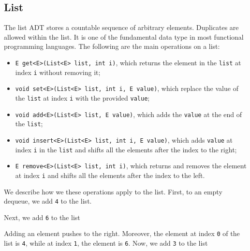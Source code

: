 \documentclass[a4paper, openany]{memoir}
\begin{document}
\subsection{List}
The list ADT stores a countable sequence of arbitrary elements. Duplicates are allowed within the list. It is one of the fundamental data type in most functional programming languages. The following are the main operations on a list:
\begin{itemize}
    \item \texttt{E get<E>(List<E> list, int i)}, which returns the element in the \texttt{list} at index \texttt{i} without removing it;
    \item \texttt{void set<E>(List<E> list, int i, E value)}, which replace the value of the \texttt{list} at index \texttt{i} with the provided \texttt{value};
    \item \texttt{void add<E>(List<E> list, E value)}, which adds the \texttt{value} at the end of the \texttt{list};
    \item \texttt{void insert<E>(List<E> list, int i, E value)}, which adds \texttt{value} at index \texttt{i} in the \texttt{list} and shifts all the elements after the index to the right;
    \item \texttt{E remove<E>(List<E> list, int i)}, which returns and removes the element at index \texttt{i} and shifts all the elements after the index to the left.
\end{itemize}
We describe how we these operations apply to the list. First, to an empty dequeue, we add \texttt{4} to the list.
\begin{center}
\end{center}
Next, we add \texttt{6} to the list
\begin{center}
\end{center}
Adding an element pushes to the right. Moreover, the element at index \texttt{0} of the list is \texttt{4}, while at index \texttt{1}, the element is \texttt{6}. Now, we add \texttt{3} to the list
\end{document}
